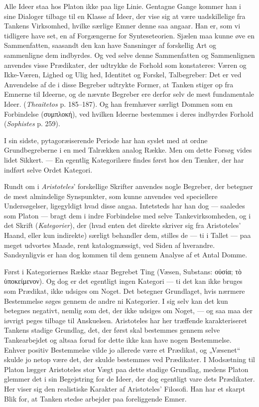 \documentclass[12pt,a4paper]{book}
\newcommand{\opage}[1]{\marginnote{\footnotesize\textit{[#1]}}}
\newcommand{\apage}[1]{\marginnote{\footnotesize\textit{[#1]}}}
\begin{document}
Alle Ideer staa hos Platon ikke paa lige Linie. Gentagne Gange kommer han
i sine Dialoger tilbage til en Klasse af Ideer, der vise sig at være
uadskillelige fra Tankens Virksomhed, hvilke særlige Emner denne saa
angaar. Han er, som vi tidligere have set, en af Forgængerne for
Synteseteorien. Sjælen maa kunne øve en Sammenfatten, saasandt den kan
have Sansninger af forskellig Art og sammenligne dem indbyrdes. Og ved
selve denne Sammenfatten og Sammenlignen anvendes visse Prædikater, der
udtrykke de Forhold som konstateres: Væren og Ikke-Væren, Lighed og
Ulig%
\opage{141}hed, Identitet og Forskel, Talbegreber: Det er ved Anvendelse af de i
disse Begreber udtrykte Former, at Tanken stiger op fra Emnerne til
Ideerne, og de nævnte Begreber ere derfor selv de mest fundamentale
Ideer. (\emph{Theaitetos} p. 185--187). Og han fremhæver særligt Dommen
som en Forbindelse (συμπλοκή), ved hvilken Ideerne bestemmes i deres
indbyrdes Forhold (\emph{Sophistes} p. 259).

I sin sidste, pytagoræiserende Periode har han syslet med at ordne
Grundbegreberne i en med Talrækken analog Række. Men om dette Forsøg
vides lidet Sikkert. --- En egentlig Kategorilære findes først hos den
Tænker, der har indført selve Ordet Kategori.

Rundt om i \emph{Aristoteles}' forskellige Skrifter anvendes nogle
Begreber, der betegner de mest almindelige Synspunkter, som kunne
anvendes ved speciellere Undersøgelser, ligegyldigt hvad disse angaa.
Intetsteds har han dog --- saaledes som Platon --- bragt dem i indre
Forbindelse med selve Tankevirksomheden, og i det Skrift
(\emph{Kategorier}), der (hvad enten det direkte skriver sig fra
Aristoteles' Haand, eller kun indirekte) særligt behandler dem, stilles
de --- ti i Tallet --- paa meget udvortes Maade, rent katalogmæssigt, ved Siden af hverandre. Sandsynligvis er han dog kommen til dem gennem
Analyse af et Antal Domme.

Først i Kategoriernes Række staar Begrebet Ting (Væsen, Substans: οὐσία;
τὸ ὑποκείμενον). Og dog er det egentligt ingen Kategori --- ti det kan
ikke bruges som Prædikat, ikke udsiges om Noget. Det betegner Grundlaget,
hvis nærmere Bestemmelse søges gennem de andre ni Kategorier. I sig selv
kan det kun betegnes negativt, nemlig som det, der ikke udsiges om Noget, --- og saa maa der iøvrigt peges tilbage til Anskuelsen. Aristoteles har
her træffende karakteriseret Tankens stadige Grundlag, det, der først
skal bestemmes gennem selve Tankearbejdet og altsaa forud for dette ikke
kan have nogen Bestemmelse. Enhver positiv Bestemmelse vilde jo allerede
være et Prædikat, og „Væsenet“ skulde jo netop være det, der skulde
bestemmes ved Prædikater. I Modsætning til Platon lægger Aristoteles stor \apage{142}
Vægt paa dette stadige Grundlag, medens Platon glemmer det i sin
Begejstring for de Ideer, der dog egentligt vare dets Prædikater. Her
viser sig den realistiske Karakter af Aristoteles' Filosofi. Han har et
skarpt Blik for, at Tanken stedse arbejder paa foreliggende Emner.
\end{document}
